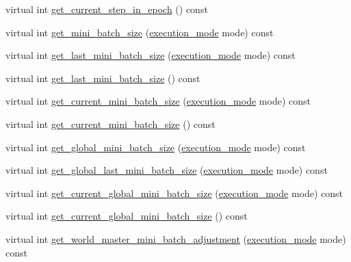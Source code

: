 \begin{DoxyCompactItemize}
\item 
virtual int \hyperlink{classlbann_1_1generic__input__layer_a660d82888a5c1eb72c2906d6367cbc35}{get\+\_\+current\+\_\+step\+\_\+in\+\_\+epoch} () const
\item 
virtual int \hyperlink{classlbann_1_1generic__input__layer_a8af40ec1991900bf23b78e6429256b9c}{get\+\_\+mini\+\_\+batch\+\_\+size} (\hyperlink{base_8hpp_a2781a159088df64ed7d47cc91c4dc0a8}{execution\+\_\+mode} mode) const
\item 
virtual int \hyperlink{classlbann_1_1generic__input__layer_a5e3c66c5726ab4a00d75bdcd2c07b640}{get\+\_\+last\+\_\+mini\+\_\+batch\+\_\+size} (\hyperlink{base_8hpp_a2781a159088df64ed7d47cc91c4dc0a8}{execution\+\_\+mode} mode) const
\item 
virtual int \hyperlink{classlbann_1_1generic__input__layer_aebca4bd6660ee5b7f99129bd84ed4f8d}{get\+\_\+last\+\_\+mini\+\_\+batch\+\_\+size} () const
\item 
virtual int \hyperlink{classlbann_1_1generic__input__layer_aad7e5f1c51037a175c6bc9abaccdc7d6}{get\+\_\+current\+\_\+mini\+\_\+batch\+\_\+size} (\hyperlink{base_8hpp_a2781a159088df64ed7d47cc91c4dc0a8}{execution\+\_\+mode} mode) const
\item 
virtual int \hyperlink{classlbann_1_1generic__input__layer_a41d278999fbd10d2cd95b9af04925cf7}{get\+\_\+current\+\_\+mini\+\_\+batch\+\_\+size} () const
\item 
virtual int \hyperlink{classlbann_1_1generic__input__layer_ac07b58c08183995852889dacfc69e459}{get\+\_\+global\+\_\+mini\+\_\+batch\+\_\+size} (\hyperlink{base_8hpp_a2781a159088df64ed7d47cc91c4dc0a8}{execution\+\_\+mode} mode) const
\item 
virtual int \hyperlink{classlbann_1_1generic__input__layer_a7ccb2e0dd8a9d9ab60e1e9d04bb80f2d}{get\+\_\+global\+\_\+last\+\_\+mini\+\_\+batch\+\_\+size} (\hyperlink{base_8hpp_a2781a159088df64ed7d47cc91c4dc0a8}{execution\+\_\+mode} mode) const
\item 
virtual int \hyperlink{classlbann_1_1generic__input__layer_ae8252d343e2f287dd7cece935ea5a075}{get\+\_\+current\+\_\+global\+\_\+mini\+\_\+batch\+\_\+size} (\hyperlink{base_8hpp_a2781a159088df64ed7d47cc91c4dc0a8}{execution\+\_\+mode} mode) const
\item 
virtual int \hyperlink{classlbann_1_1generic__input__layer_aaaa60fb7b94353fccaff25e6a862d833}{get\+\_\+current\+\_\+global\+\_\+mini\+\_\+batch\+\_\+size} () const
\item 
virtual int \hyperlink{classlbann_1_1generic__input__layer_a1c2a503d4009b6360d96db128796983c}{get\+\_\+world\+\_\+master\+\_\+mini\+\_\+batch\+\_\+adjustment} (\hyperlink{base_8hpp_a2781a159088df64ed7d47cc91c4dc0a8}{execution\+\_\+mode} mode) const

\end{DoxyCompactItemize}
